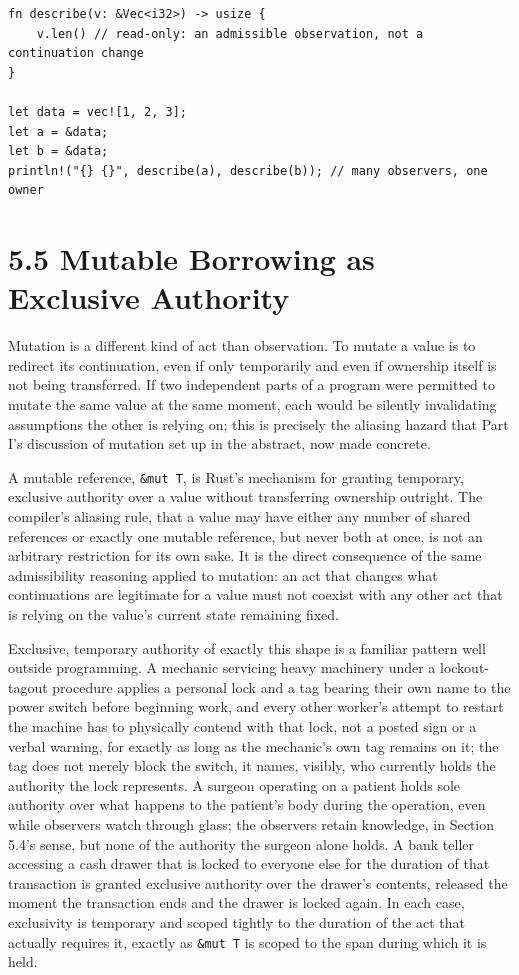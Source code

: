 \documentclass[11pt]{book}
\begin{document}
\begin{lstlisting}
fn describe(v: &Vec<i32>) -> usize {
    v.len() // read-only: an admissible observation, not a continuation change
}

let data = vec![1, 2, 3];
let a = &data;
let b = &data;
println!("{} {}", describe(a), describe(b)); // many observers, one owner
\end{lstlisting}

\section*{5.5 Mutable Borrowing as Exclusive Authority}

Mutation is a different kind of act than observation. To mutate a value is to redirect its continuation, even if only temporarily and even if ownership itself is not being transferred. If two independent parts of a program were permitted to mutate the same value at the same moment, each would be silently invalidating assumptions the other is relying on; this is precisely the aliasing hazard that Part I's discussion of mutation set up in the abstract, now made concrete.

A mutable reference, \texttt{\&mut T}, is Rust's mechanism for granting temporary, exclusive authority over a value without transferring ownership outright. The compiler's aliasing rule, that a value may have either any number of shared references or exactly one mutable reference, but never both at once, is not an arbitrary restriction for its own sake. It is the direct consequence of the same admissibility reasoning applied to mutation: an act that changes what continuations are legitimate for a value must not coexist with any other act that is relying on the value's current state remaining fixed.

Exclusive, temporary authority of exactly this shape is a familiar pattern well outside programming. A mechanic servicing heavy machinery under a lockout-tagout procedure applies a personal lock and a tag bearing their own name to the power switch before beginning work, and every other worker's attempt to restart the machine has to physically contend with that lock, not a posted sign or a verbal warning, for exactly as long as the mechanic's own tag remains on it; the tag does not merely block the switch, it names, visibly, who currently holds the authority the lock represents. A surgeon operating on a patient holds sole authority over what happens to the patient's body during the operation, even while observers watch through glass; the observers retain knowledge, in Section 5.4's sense, but none of the authority the surgeon alone holds. A bank teller accessing a cash drawer that is locked to everyone else for the duration of that transaction is granted exclusive authority over the drawer's contents, released the moment the transaction ends and the drawer is locked again. In each case, exclusivity is temporary and scoped tightly to the duration of the act that actually requires it, exactly as \texttt{\&mut T} is scoped to the span during which it is held.
\end{document}
